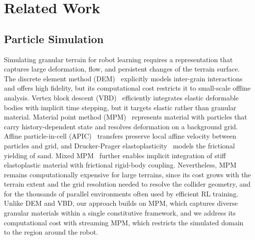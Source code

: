 \section{Related Work}

\subsection{Particle Simulation}
Simulating granular terrain for robot learning requires a representation that captures large deformation, flow, and persistent changes of the terrain surface.
The discrete element method (DEM)~\cite{dem} explicitly models inter-grain interactions and offers high fidelity, but its computational cost restricts it to small-scale offline analysis.
Vertex block descent (VBD)~\cite{vbd} efficiently integrates elastic deformable bodies with implicit time stepping, but it targets elastic rather than granular material.
Material point method (MPM)~\cite{mpm} represents material with particles that carry history-dependent state and resolves deformation on a background grid.
Affine particle-in-cell (APIC)~\cite{apic} transfers preserve local affine velocity between particles and grid, and Drucker-Prager elastoplasticity~\cite{sand} models the frictional yielding of sand.
Mixed MPM~\cite{daviet2026mixedmpm} further enables implicit integration of stiff elastoplastic material with frictional rigid-body coupling.
Nevertheless, MPM remains computationally expensive for large terrains, since its  cost grows with the terrain extent and the grid resolution needed to resolve the collider geometry, and for the thousands of parallel environments often used by efficient RL training.
Unlike DEM and VBD, our approach builds on MPM, which captures diverse granular materials within a single constitutive framework, and we address its computational cost with streaming MPM, which restricts the simulated domain to the region around the robot.

